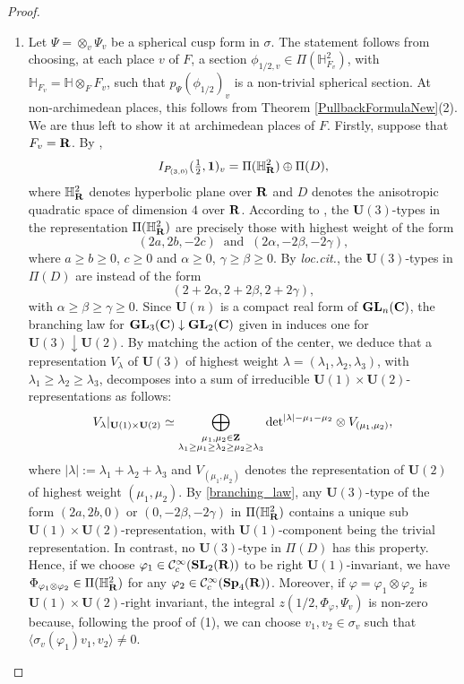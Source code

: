 \documentclass[11pt, reqno]{amsart}
\theoremstyle{plain}
\theoremstyle{definition}
\theoremstyle{remark}
\theoremstyle{plain}
\def\Z{{\bf Z}}
\def\C{{\bf C}}
\def\R{{\bf R}}
\def\SL{{\mathbf{SL}}}
\def\Sp{{\mathbf{Sp}}}
\def\U{{\mathbf{U}}}
\def\GL{\mathbf{GL}}
\begin{document}
\begin{proof}
\begin{enumerate}
    \item Let $\Psi = \otimes_v \Psi_v$ be a spherical cusp form in $\sigma$. The statement follows from choosing, at each place $v$ of $F$, a section $\phi_{1/2,v} \in \Pi(\mathbb{H}_{F_v}^2)$, with $\mathbb{H}_{F_v} = \mathbb{H} \otimes_F {F_v}$, such that $p_\Psi(\phi_{1/2})_v$ is a non-trivial spherical section. At non-archimedean places, this follows from Theorem \ref{PullbackFormulaNew}(2). We are thus left to show it at archimedean places of $F$. Firstly, suppose that $F_v = \R$. By \cite[Proposition 5.3(ii)]{GanQiuTakeda},  $$I_{P_{(3,0)}}(\tfrac{1}{2},\mathbf{1})_v =\Pi(\mathbb{H}^2_\R) \oplus \Pi(D),$$ where $\mathbb{H}^2_\R$ denotes hyperbolic plane over $\R$ and $D$ denotes the anisotropic quadratic space of dimension $4$ over $\R$. According to \cite[Proposition 2.8, (ii)]{KudlaRallis}, the $\U(3)$-types in the representation $\Pi(\mathbb{H}^2_\R)$ are precisely those with highest weight of the form
    \[(2a,2b,-2c)\;\;\text{and}\;\;(2\alpha,-2\beta,-2\gamma),\]
 where $a\geq b\geq 0$, $c\geq 0$ and $\alpha \geq 0$,  $\gamma \geq \beta \geq 0$. By \emph{loc.cit.}, the $\U(3)$-types in $\Pi(D)$ are instead of the form $$
    (2+2\alpha,2+2\beta, 2+2\gamma),$$ with $\alpha\geq \beta\geq \gamma\geq 0$. Since $\U(n)$ is a compact real form of $\GL_n(\C)$, the branching law for $\GL_3(\C)\downarrow \GL_2(\C)$ given in \cite[Theorem 1]{Branching:Law} induces one for $\mathbf{U}(3)\downarrow \mathbf{U}(2)$. By matching the action of the center, we deduce that a representation $V_{\lambda}$ of $\U(3)$ of highest weight $\lambda = (\lambda_1,\lambda_2,\lambda_3)$, with $\lambda_1\geq \lambda_2\geq \lambda_3$, decomposes into a sum of irreducible $\U(1)\times \U(2)$-representations as follows:
    \begin{align}\label{branching_law}
        V_{\lambda}|_{\U(1)\times \U(2)}\simeq \bigoplus_{\substack{\mu_1,\mu_2\in \Z\\\lambda_1\geq\mu_1\geq \lambda_2\geq \mu_2\geq\lambda_3}}\mathrm{det}^{|\lambda|-\mu_1-\mu_2}\otimes V_{(\mu_1,\mu_2)},
    \end{align}
    where $|\lambda| := \lambda_1+\lambda_2+\lambda_3$ and $V_{(\mu_1,\mu_2)}$ denotes the representation of $\U(2)$ of highest weight $(\mu_1,\mu_2)$.  By \eqref{branching_law}, any $\U(3)$-type of the form $(2a,2b,0)$ or $(0,-2\beta,-2\gamma)$ in $\Pi(\mathbb{H}^2_\R)$ contains a unique sub $\U(1)\times \U(2)$-representation, with $\U(1)$-component being the trivial representation. In contrast, no $\U(3)$-type in $\Pi(D)$ has this property. Hence, if we choose $\varphi_1 \in \mathcal{C}^{\infty}_c(\SL_2(\R))$ to be right $\U(1)$-invariant, we have $\Phi_{\varphi_1 \otimes \varphi_2}\in \Pi(\mathbb{H}^2_\R)$ for any $\varphi_2 \in \mathcal{C}^{\infty}_c(\Sp_4(\R))$. Moreover, if  $\varphi = \varphi_1 \otimes \varphi_2$ is $\U(1)\times \U(2)$-right invariant, the integral $z(1/2, \Phi_{\varphi}, \Psi_v)$ is non-zero because, following the proof of (1), we can choose $v_1,v_2\in \sigma_v$ such that $\langle\sigma_v(\varphi_1)v_1,v_2\rangle\neq 0$. 
    

\end{enumerate}
\end{proof}
\end{document}
